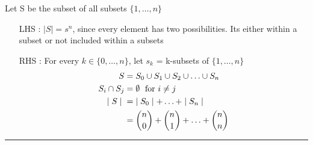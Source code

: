 \documentclass{article}
\newenvironment{proof}{{\bf Proof:}}{\hfill\rule{2mm}{2mm}}
\begin{document}
\begin{proof}Let S be the subset of all subsets \(\{1, \ldots, n\}\)
\begin{itemize}
\item[LHS : ] \(\mid S \mid = s^n \), since every element has two possibilities. Its either within a subset or not included within a subsets 
\item[RHS : ] For every \(k \in \{0, \ldots, n\}\), let \(s_k\) = k-subsets of \(\{1, \ldots, n\}\) 
\[\begin{aligned}
 S & = S_0 \cup S_1 \cup S_2 \cup \ldots \cup S_n \\
S_i \cap S_j  & =  \emptyset \text{\hspace{0.1cm} for  } i \neq j \\
\mid S \mid \hspace{0.1cm} & = \hspace{0.1cm} \mid S_0  \mid + \ldots +  \mid S_n \mid  \\
& = {n \choose 0} + {n \choose 1} + \ldots + {n \choose n}
\end{aligned}\]

\end{itemize}
\end{proof}
\end{document}
